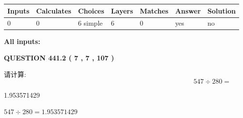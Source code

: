 \documentclass{ctexart}
\begin{document}
 
\noindent{}
 
 
   
   
   
   
\noindent\begin{tabular}{|l|l|l|l|l|l|l|}
 \hline
Inputs & Calculates & Choices & Layers & Matches & Answer & Solution \\ \hline
 0  & 
 0  & 
 6
  simple  
  & 
 6  & 
 0  & 
  yes & 
  no 
  \\ \hline
 \end{tabular}
   
   
   
   
\noindent{}
   
   
   
   
\noindent\vspace{0.1in}\hspace{-0.08in} {\textbf{\Large{All inputs: }}}
   
   
  
\vspace{0.2in}
  
{\textbf{\Large{QUESTION
441.2 
 ( 7 , 7 , 107 )
}}}
  
  
 
请计算:
\begin{equation}
547  \div    %
280 = \nonumber
\end{equation}
 
 
 
\noindent{}
 
 

1.953571429
 
 
\noindent{}
 
 

 
 
 
\noindent{}
 
 

$ %
547 \div  %
280=   %
1.953571429$
 
 
\noindent{}
 
 

 
   
\end{document}
